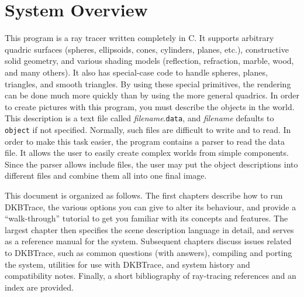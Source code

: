 \chapter{System Overview}

This program is a ray tracer written completely in C.  It supports
arbitrary quadric surfaces (spheres, ellipsoids, cones, cylinders,
planes, etc.), constructive solid geometry, and various shading models
(reflection, refraction, marble, wood, and many others).  It also has
special-case code to handle spheres, planes, triangles, and smooth
triangles.  By using these special primitives, the rendering can be
done much more quickly than by using the more general quadrics.  In
order to create pictures with this program, you must describe the
objects in the world.  This description is a text file called
{\em filename}.{\tt data}, and {\em filename\/} defaults to {\tt object}
if not specified.  Normally, such files are difficult to write and to
read.  In order to make this task easier, the program contains a
parser to read the data file.  It allows the user to easily create
complex worlds from simple components.  Since the parser allows
include files, the user may put the object descriptions into different
files and combine them all into one final image.

This document is organized as follows. The first chapters describe how
to run DKBTrace, the various options you can give to alter its
behaviour, and provide a ``walk-through'' tutorial to get you familiar
with its concepts and features. The largest chapter then specifies the
scene description language in detail, and serves as a reference manual
for the system. Subsequent chapters discuss issues related to
DKBTrace, such as common questions (with answers), compiling and
porting the system, utilities for use with DKBTrace, and system
history and compatibility notes. Finally, a short bibliography of
ray-tracing references and an index are provided.
